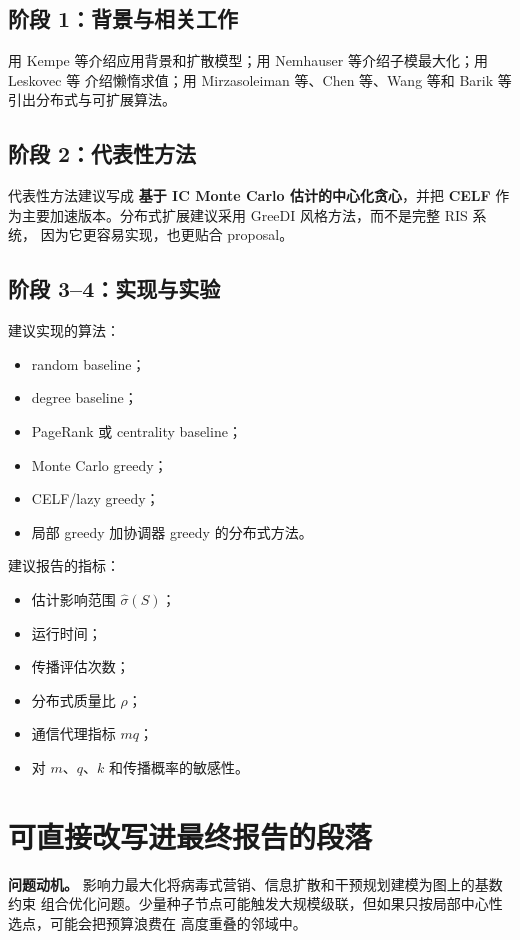 \documentclass[UTF8,10pt]{ctexart}
\begin{document}
\subsection{阶段 1：背景与相关工作}

用 Kempe 等介绍应用背景和扩散模型；用 Nemhauser 等介绍子模最大化；用 Leskovec 等
介绍懒惰求值；用 Mirzasoleiman 等、Chen 等、Wang 等和 Barik 等引出分布式与可扩展算法。

\subsection{阶段 2：代表性方法}

代表性方法建议写成 \textbf{基于 IC Monte Carlo 估计的中心化贪心}，并把
\textbf{CELF} 作为主要加速版本。分布式扩展建议采用 GreeDI 风格方法，而不是完整 RIS 系统，
因为它更容易实现，也更贴合 proposal。

\subsection{阶段 3--4：实现与实验}

建议实现的算法：
\begin{itemize}
\item random baseline；
\item degree baseline；
\item PageRank 或 centrality baseline；
\item Monte Carlo greedy；
\item CELF/lazy greedy；
\item 局部 greedy 加协调器 greedy 的分布式方法。
\end{itemize}

建议报告的指标：
\begin{itemize}
\item 估计影响范围 $\widehat{\sigma}(S)$；
\item 运行时间；
\item 传播评估次数；
\item 分布式质量比 $\rho$；
\item 通信代理指标 $mq$；
\item 对 $m$、$q$、$k$ 和传播概率的敏感性。
\end{itemize}

\section{可直接改写进最终报告的段落}

\textbf{问题动机。} 影响力最大化将病毒式营销、信息扩散和干预规划建模为图上的基数约束
组合优化问题。少量种子节点可能触发大规模级联，但如果只按局部中心性选点，可能会把预算浪费在
高度重叠的邻域中。
\end{document}
